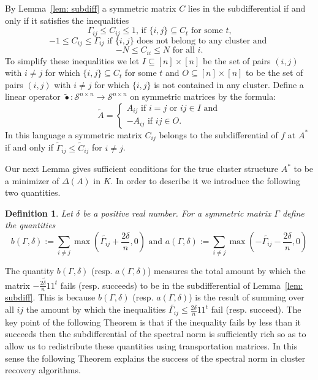 \documentclass[12pt]{amsart}
\newtheorem{definition}[lemma]{Definition}
\theoremstyle{remark}
\begin{document}
By Lemma~\ref{lem: subdiff} a symmetric matrix $C$ lies in the subdifferential if and only if it satisfies the inequalities
\[ \Gamma_{ij}\leq C_{ij}\leq 1 \text{, if $\{i,j\}\subseteq C_t$ for some $t$,}\]
\[-1\leq C_{ij} \leq \Gamma_{ij} \text{ if $\{i,j\}$ does not belong to any cluster and } \]
\[-N \leq C_{ii} \leq N \text{ for all }i.\]
To simplify these inequalities we let $I\subseteq [n]\times [n]$ be the set of pairs $(i,j)$ with $i\neq j$ for which $\{i,j\}\subseteq C_t$ for some $t$ and $O\subseteq [n]\times [n]$ to be the set of pairs $(i,j)$ with $i\neq j$ for which $\{i,j\}$ is not contained in any cluster. Define a linear operator $\widetilde{\bullet}: \mathcal{S}^{n\times n}\rightarrow \mathcal{S}^{n\times n}$ on symmetric matrices by the formula:
\[ \widetilde{A} = 
\begin{cases}
A_{ij}\text{ if $i=j$ or $ij\in I$ and}\\
-A_{ij}\text{ if $ij\in O$.} 
\end{cases}
\]
In this language a symmetric matrix $C_{ij}$ belongs to the subdifferential of $f$ at $A^*$ if and only if $\widetilde{\Gamma}_{ij}\leq \widetilde{C}_{ij}$ for $i\neq j$.

Our next Lemma gives sufficient conditions for the true cluster structure $A^*$ to be a minimizer of $\Delta(A)$ in $K$. In order to describe it we introduce the following two quantities. 

\begin{definition} Let $\delta$ be a positive real number. For a symmetric matrix $\Gamma$ define the quantities
\[b(\Gamma,\delta):=\sum_{i\neq j} \max\left(\widetilde{\Gamma_{ij}}+\frac{2\delta}{n},0\right)
\text{ and } a(\Gamma,\delta):=\sum_{i\neq j} \max\left(-\widetilde{\Gamma_{ij}}-\frac{2\delta}{n},0\right)
\]\end{definition}
The quantity $b(\Gamma,\delta)$ (resp. $a(\Gamma,\delta)$) measures the total amount by which the matrix $\widetilde{-\frac{2\delta}{n}11^t}$ fails (resp. succeeds) to be in the subdifferential of Lemma~\ref{lem: subdiff}. This is because $b(\Gamma,\delta)$ (resp. $a(\Gamma,\delta)$) is the result of summing over all $ij$ the amount by which the inequalities $\widetilde{\Gamma_{ij}}\leq \frac{2\delta}{n} 11^t$ fail (resp. succeed). The key point of the following Theorem is that if the inequality fails by less than it succeeds then the subdifferential of the spectral norm is sufficiently rich so as to allow us to redistribute these quantities using transportation matrices. In this sense the following Theorem explains the success of the spectral norm in cluster recovery algorithms.
\end{document}
